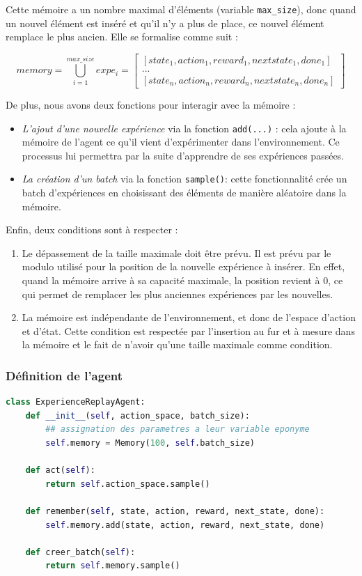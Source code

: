 \documentclass[10pt,a4paper]{article}
\begin{document}
Cette mémoire a un nombre maximal d'éléments (variable \lstinline{max_size}), donc quand un nouvel élément est inséré et qu'il n'y a plus de place, ce nouvel élément remplace le plus ancien. Elle se formalise comme suit : 

$$
memory = \bigcup\limits_{i=1}^{max\_size} expe_{i} = 
\begin{bmatrix}
[state_1, action_1, reward_1, nextstate_1, done_1] \\
... \\
[state_n, action_n, reward_n, nextstate_n, done_n]
\end{bmatrix}
$$

De plus, nous avons deux fonctions pour interagir avec la mémoire :
\begin{itemize}
	\item \textit{L'ajout d'une nouvelle expérience} via la fonction \lstinline{add(...)} : cela ajoute à la mémoire de l'agent ce qu'il vient d'expérimenter dans l'environnement. Ce processus lui permettra par la suite d'apprendre de ses expériences passées.
	\item \textit{La création d'un batch} via la fonction \lstinline{sample()}: cette fonctionnalité crée un batch d'expériences en choisissant des éléments de manière aléatoire dans la mémoire.
\end{itemize}

Enfin, deux conditions sont à respecter :
\begin{enumerate}
	\item Le dépassement de la taille maximale doit être prévu. Il est prévu par le modulo utilisé pour la position de la nouvelle expérience à insérer. En effet, quand la mémoire arrive à sa capacité maximale, la position revient à 0, ce qui permet de remplacer les plus anciennes expériences par les nouvelles.
	\item La mémoire est indépendante de l’environnement, et donc de l’espace d’action et d’état. Cette condition est respectée par l'insertion au fur et à mesure dans la mémoire et le fait de n'avoir qu'une taille maximale comme condition.
\end{enumerate}

\subsubsection{Définition de l'agent}

\begin{lstlisting}[language=Python, caption=Implémentation de l'agent utilisant son expérience]
class ExperienceReplayAgent:
    def __init__(self, action_space, batch_size):
        ## assignation des parametres a leur variable eponyme
        self.memory = Memory(100, self.batch_size)
        
    def act(self):
        return self.action_space.sample()

    def remember(self, state, action, reward, next_state, done):
        self.memory.add(state, action, reward, next_state, done)

    def creer_batch(self):
        return self.memory.sample()
\end{lstlisting}
\end{document}
